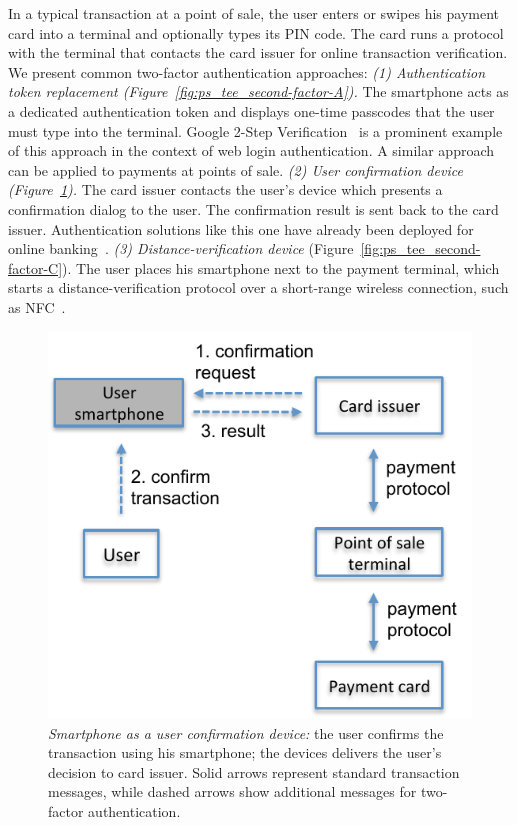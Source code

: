 In a typical transaction at a point of sale, the user enters or swipes his
payment card into a terminal and optionally types its PIN code. The card runs a
protocol with the terminal that contacts the card issuer for online transaction
verification. We present common
two-factor authentication approaches: \emph{(1) Authentication token
replacement (Figure~\ref{fig:ps_tee_second-factor-A}).} The smartphone acts as
a dedicated authentication token and displays one-time passcodes that the user
must type into the terminal. Google 2-Step
Verification~\cite{google_authentication} is a prominent example of this
approach in the context of web login authentication. A similar approach can be
applied to payments at points of sale. \emph{(2) User confirmation device
(Figure~\ref{fig:ps_tee_second-factor-B}).} The card issuer contacts the user's
device which presents a confirmation dialog to the user. The confirmation
result is sent back to the card issuer. Authentication solutions like this one
have already been deployed for online banking~\cite{validsoft}. \emph{(3)
Distance-verification device} (Figure~\ref{fig:ps_tee_second-factor-C}). The
user places his smartphone next to the payment terminal, which starts a
distance-verification protocol over a short-range wireless connection, such as
NFC~\cite{googlewallet}.

\begin{figure}[!ht]
  \centering
  \includegraphics[width=.5\linewidth]{figures/phonesecures/tee_second-factor-B}
  \caption[Smartphone as a user confirmation device]{\emph{Smartphone as a user
  confirmation device:} the user confirms the transaction using his smartphone;
  the devices delivers the user's decision to card issuer. Solid arrows
  represent standard transaction messages, while dashed arrows show additional
  messages for two-factor authentication.}
  \label{fig:ps_tee_second-factor-B}
\end{figure}

